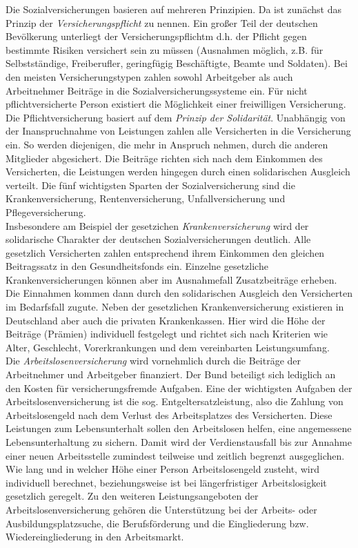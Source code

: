 \documentclass[a4paper, 12pt]{report}
\begin{document}
Die Sozialversicherungen basieren auf mehreren Prinzipien. Da ist zunächst das
Prinzip der \emph{Versicherungspflicht} zu nennen. Ein großer Teil der deutschen
Bevölkerung unterliegt der Versicherungspflichtm d.h. der Pflicht gegen
bestimmte Risiken versichert sein zu müssen (Ausnahmen möglich, z.B. für
Selbstständige, Freiberufler, geringfügig Beschäftigte, Beamte und Soldaten).
Bei den meisten Versicherungstypen zahlen sowohl Arbeitgeber als auch
Arbeitnehmer Beiträge in die Sozialversicherungssysteme ein. Für nicht
pflichtversicherte Person existiert die Möglichkeit einer freiwilligen
Versicherung. \\

Die Pflichtversicherung basiert auf dem \emph{Prinzip der Solidarität}.
Unabhängig von der Inanspruchnahme von Leistungen zahlen alle Versicherten in
die Versicherung ein. So werden diejenigen, die mehr in Anspruch nehmen, durch
die anderen Mitglieder abgesichert. Die Beiträge richten sich nach dem Einkommen
des Versicherten, die Leistungen werden hingegen durch einen solidarischen
Ausgleich verteilt. Die fünf wichtigsten Sparten der Sozialversicherung sind die
Krankenversicherung, Rentenversicherung, Unfallversicherung und
Pflegeversicherung. \\

Insbesondere am Beispiel der gesetzichen \emph{Krankenversicherung} wird der
solidarische Charakter der deutschen Sozialversicherungen deutlich. Alle
gesetzlich Versicherten zahlen entsprechend ihrem Einkommen den gleichen
Beitragssatz in den Gesundheitsfonds ein. Einzelne gesetzliche
Krankenversicherungen können aber im Ausnahmefall Zusatzbeiträge erheben. Die
Einnahmen kommen dann durch den solidarischen Ausgleich den Versicherten im
Bedarfsfall zugute. Neben der gesetzlichen Krankenversicherung existieren in
Deutschland aber auch die privaten Krankenkassen. Hier wird die Höhe der
Beiträge (Prämien) individuell festgelegt und richtet sich nach Kriterien wie
Alter, Geschlecht, Vorerkrankungen und dem vereinbarten Leistungsumfang. \\

Die \emph{Arbeitslosenversicherung} wird vornehmlich durch die Beiträge der
Arbeitnehmer und Arbeitgeber finanziert. Der Bund beteiligt sich lediglich an
den Kosten für versicherungsfremde Aufgaben. Eine der wichtigsten Aufgaben der
Arbeitslosenversicherung ist die sog. Entgeltersatzleistung, also die Zahlung
von Arbeitslosengeld nach dem Verlust des Arbeitsplatzes des Versicherten. Diese
Leistungen zum Lebensunterhalt sollen den Arbeitslosen helfen, eine angemessene
Lebensunterhaltung zu sichern. Damit wird der Verdienstausfall bis zur Annahme
einer neuen Arbeitsstelle zumindest teilweise und zeitlich begrenzt
ausgeglichen. Wie lang und in welcher Höhe einer Person Arbeitslosengeld
zusteht, wird individuell berechnet, beziehungsweise ist bei längerfristiger
Arbeitslosigkeit gesetzlich geregelt. Zu den weiteren Leistungsangeboten der
Arbeitslosenversicherung gehören die Unterstützung bei der Arbeits- oder
Ausbildungsplatzsuche, die Berufsförderung und die Eingliederung bzw.
Wiedereingliederung in den Arbeitsmarkt. \\
\end{document}
